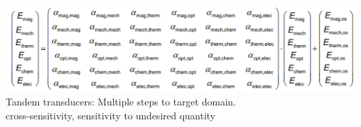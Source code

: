 \documentclass[5pt,landscape]{article}
\begin{document}
\begin{multicols*}{5}
\includegraphics[width = \columnwidth]{images/transconduction_matrix.png}\\
Tandem transducers: Multiple steps to target domain.\\
cross-sensitivity, sensitivity to undesired quantity

\end{multicols*}
\end{document}
